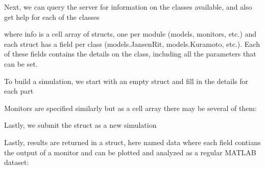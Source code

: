 Next, we can query the server for information on the classes available,
and also get help for each of the classes


\noindent where info is a cell array of structs, one per module (models,
monitors, etc.) and each struct has a field per class (models.JansenRit, 
models.Kuramoto, etc.). Each of these fields contains the details on 
the class, including all the parameters that can be set. 

To build a simulation, we start with an empty struct
and fill in the details for each part

%
%
%
%

Monitors are specified similarly but as a cell array there may be
several of them:

%


Lastly, we submit the struct as a new simulation


\noindent Lastly, results are returned in a struct, here named data
where each field contians the output of a monitor and can be plotted
and analyzed as a regular MATLAB dataset:







